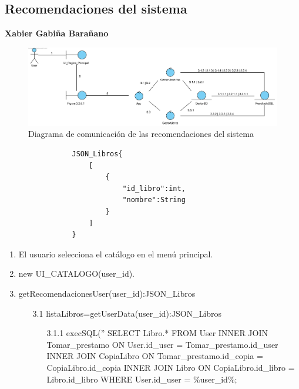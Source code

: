 ﻿\documentclass{report}
\begin{document}
\begin{enumerate}
        \section{Recomendaciones del sistema}
            \textbf{Xabier Gabiña Barañano}
            \begin{figure}[H]
                \centering
                \includegraphics[width=1.0\textwidth]{img/comunicacion/recomendacionesDelSistema.png}
                \caption{Diagrama de comunicación de las recomendaciones del sistema}
            \end{figure}
            \begin{verbatim}
                JSON_Libros{
                    [
                        {
                            "id_libro":int,
                            "nombre":String
                        }
                    ]
                }
            \end{verbatim}
            \clearpage
            \begin{enumerate}
                \item El usuario selecciona el catálogo en el menú principal.
                \item new UI\_CATALOGO(user\_id).
                \item getRecomendacionesUser(user\_id):JSON\_Libros
                \begin{enumerate}
                    \item[3.1] listaLibros=getUserData(user\_id):JSON\_Libros
                    \begin{enumerate}
                        \item[3.1.1] execSQL(''
                            SELECT Libro.* 
                            FROM User 
                            INNER JOIN Tomar\_prestamo ON User.id\_user = Tomar\_prestamo.id\_user
                            INNER JOIN CopiaLibro ON Tomar\_prestamo.id\_copia = CopiaLibro.id\_copia
                            INNER JOIN Libro ON CopiaLibro.id\_libro = Libro.id\_libro
                            WHERE User.id\_user = \%user\_id\%;

\end{enumerate}
\end{enumerate}
\end{enumerate}
\end{enumerate}
\end{document}
